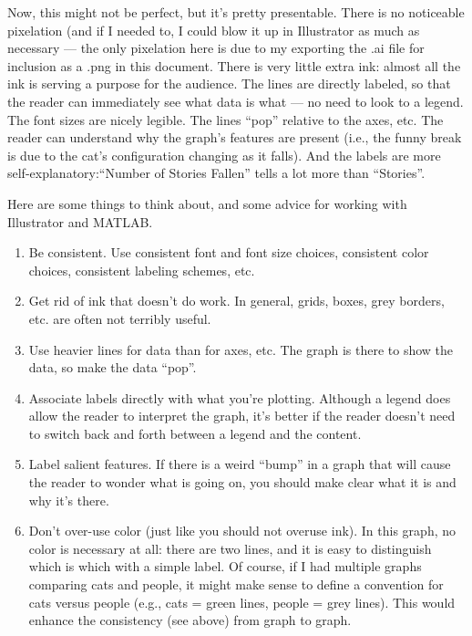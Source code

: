 Now, this might not be perfect,  but it's pretty presentable.  There is no noticeable pixelation (and if I needed to, I could blow it up in Illustrator as much as necessary --- the only pixelation here is due to my exporting the .ai file for inclusion as a .png in this document.  There is very little extra ink: almost all the ink is serving a purpose for the audience.  The lines are directly labeled, so that the reader can immediately see what data is what --- no need to look to a legend.  The font sizes are nicely legible.  The lines ``pop'' relative to the axes, etc.  The reader can understand why the graph's features are present (i.e., the funny break is due to the cat's configuration changing as it falls).  And the labels are more self-explanatory:``Number of Stories Fallen'' tells a lot more than ``Stories''.

Here are some things to think about, and some advice for working with Illustrator and MATLAB. 
\begin{enumerate}
\item Be consistent.  Use consistent font and font size choices, consistent color choices, consistent labeling schemes, etc. 
\item Get rid of ink that doesn't do work.  In general, grids, boxes, grey borders, etc. are often not terribly useful.
\item Use heavier lines for data than for axes, etc.  The graph is there to show the data, so make the data ``pop''.
\item Associate labels directly with what you're plotting.  Although a legend does allow the reader to interpret the graph, it's better if the reader doesn't need to switch back and forth between a legend and the content.
\item Label salient features.  If there is a weird ``bump'' in a graph that will cause the reader to wonder what is going on, you should make clear what it is and why it's there.
\item Don't over-use color (just like you should not overuse ink).  In this graph, no color is necessary at all: there are two lines, and it is easy to distinguish which is which with a simple label.  Of course, if I had multiple graphs comparing cats and people, it might make sense to define a convention for cats versus people (e.g., cats = green lines, people = grey lines).  This would enhance the consistency (see above) from graph to graph.  
\end{enumerate}

